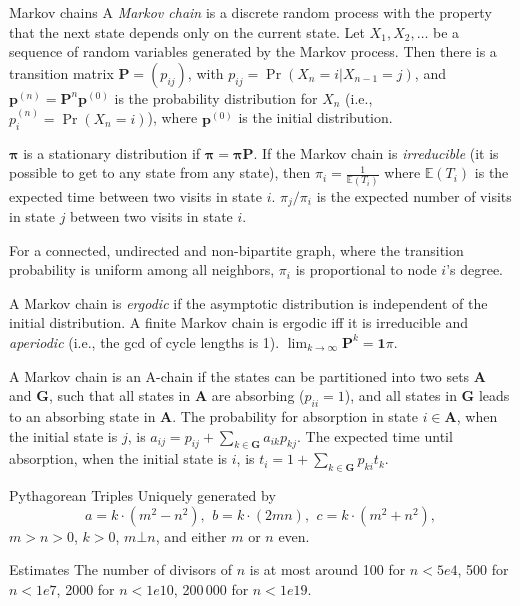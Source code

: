 \begin{misc}{Markov chains}
	A \emph{Markov chain} is a discrete random process with the property that the next state depends only on the current state.
	Let $X_1,X_2,\ldots$ be a sequence of random variables generated by the Markov process.
	Then there is a transition matrix $\mathbf{P} = (p_{ij})$, with $p_{ij} = \Pr(X_n = i | X_{n-1} = j)$,
	and $\mathbf{p}^{(n)} = \mathbf P^n \mathbf p^{(0)}$ is the probability distribution for $X_n$ (i.e., $p^{(n)}_i = \Pr(X_n = i)$),
	where $\mathbf{p}^{(0)}$ is the initial distribution.

	$\mathbf{\pi}$ is a stationary distribution if $\mathbf{\pi} = \mathbf{\pi P}$.
	If the Markov chain is \emph{irreducible} (it is possible to get to any state from any state),
	then $\pi_i = \frac{1}{\mathbb{E}(T_i)}$ where $\mathbb{E}(T_i)$  is the expected time between two visits in state $i$.
	$\pi_j/\pi_i$ is the expected number of visits in state $j$ between two visits in state $i$.

	For a connected, undirected and non-bipartite graph, where the transition probability is uniform among all neighbors, $\pi_i$ is proportional to node $i$'s degree.

	A Markov chain is \emph{ergodic} if the asymptotic distribution is independent of the initial distribution.
	A finite Markov chain is ergodic iff it is irreducible and \emph{aperiodic} (i.e., the gcd of cycle lengths is 1).
	$\lim_{k\rightarrow\infty}\mathbf{P}^k = \mathbf{1}\pi$.

	A Markov chain is an A-chain if the states can be partitioned into two sets $\mathbf{A}$ and $\mathbf{G}$, such that all states in $\mathbf{A}$ are absorbing ($p_{ii}=1$), and all states in $\mathbf{G}$ leads to an absorbing state in $\mathbf{A}$.
	The probability for absorption in state $i\in\mathbf{A}$, when the initial state is $j$, is $a_{ij} = p_{ij}+\sum_{k\in\mathbf{G}} a_{ik}p_{kj}$.
	The expected time until absorption, when the initial state is $i$, is $t_i = 1+\sum_{k\in\mathbf{G}}p_{ki}t_k$.
\end{misc}

\begin{misc}{Pythagorean Triples}
	Uniquely generated by
	\[ a=k\cdot (m^{2}-n^{2}),\ \,b=k\cdot (2mn),\ \,c=k\cdot (m^{2}+n^{2}),\]
	$m > n > 0$, $k > 0$, $m \bot n$, and either $m$ or $n$ even.
\end{misc}

\begin{misc}{Estimates}
	The number of divisors of $n$ is at most around 100 for $n < 5e4$, 500 for $n < 1e7$, 2000 for $n < 1e10$, 200\,000 for $n < 1e19$.
\end{misc}

